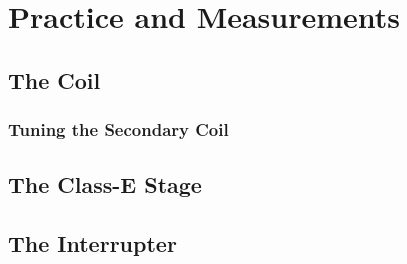 \setchapterpreamble[u]{\margintoc}

\chapter{Practice and Measurements} %

\section{The Coil}

\subsection{Tuning the Secondary Coil}

\section{The Class-E Stage}

\section{The Interrupter}